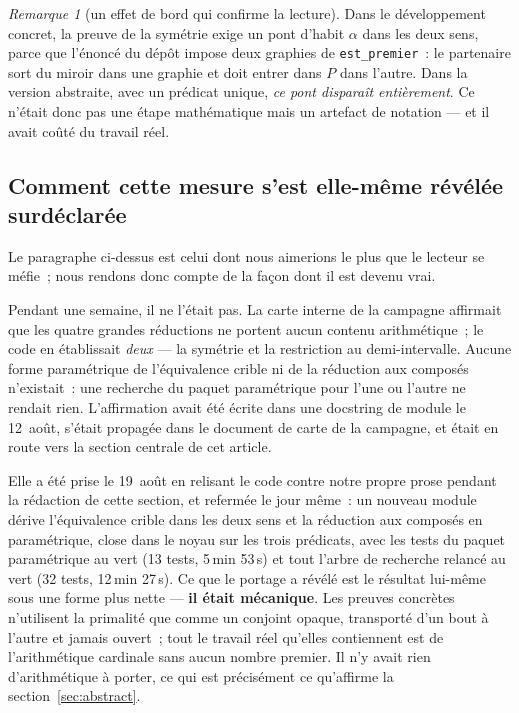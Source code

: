 \documentclass[11pt]{article}
\theoremstyle{remark}\newtheorem{remarque}{Remarque}
\begin{document}
\begin{remarque}[un effet de bord qui confirme la lecture]
Dans le développement concret, la preuve de la symétrie exige un pont d'habit $\alpha$
dans les deux sens, parce que l'énoncé du dépôt impose deux graphies de
\texttt{est\_premier}~: le partenaire sort du miroir dans une graphie et doit entrer dans
$P$ dans l'autre. Dans la version abstraite, avec un prédicat unique, \emph{ce pont
disparaît entièrement}. Ce n'était donc pas une étape mathématique mais un artefact de
notation --- et il avait coûté du travail réel.
\end{remarque}

\subsection{Comment cette mesure s'est elle-même révélée surdéclarée}
\label{sec:overclaim}

Le paragraphe ci-dessus est celui dont nous aimerions le plus que le lecteur se méfie~;
nous rendons donc compte de la façon dont il est devenu vrai.

Pendant une semaine, il ne l'était pas. La carte interne de la campagne affirmait que les
quatre grandes réductions ne portent aucun contenu arithmétique~; le code en établissait
\emph{deux} --- la symétrie et la restriction au demi-intervalle. Aucune forme
paramétrique de l'équivalence crible ni de la réduction aux composés n'existait~: une
recherche du paquet paramétrique pour l'une ou l'autre ne rendait rien. L'affirmation
avait été écrite dans une docstring de module le 12~août, s'était propagée dans le
document de carte de la campagne, et était en route vers la section centrale de cet
article.

Elle a été prise le 19~août en relisant le code contre notre propre prose pendant la
rédaction de cette section, et refermée le jour même~: un nouveau module dérive
l'équivalence crible dans les deux sens et la réduction aux composés en paramétrique,
close dans le noyau sur les trois prédicats, avec les tests du paquet paramétrique au
vert (13 tests, 5\,min 53\,s) et tout l'arbre de recherche relancé au vert (32 tests,
12\,min 27\,s). Ce que le portage a révélé est le résultat lui-même sous une forme plus
nette --- \textbf{il était mécanique}. Les preuves concrètes n'utilisent la primalité que
comme un conjoint opaque, transporté d'un bout à l'autre et jamais ouvert~; tout le
travail réel qu'elles contiennent est de l'arithmétique cardinale sans aucun nombre
premier. Il n'y avait rien d'arithmétique à porter, ce qui est précisément ce
qu'affirme la section~\ref{sec:abstract}.
\end{document}
